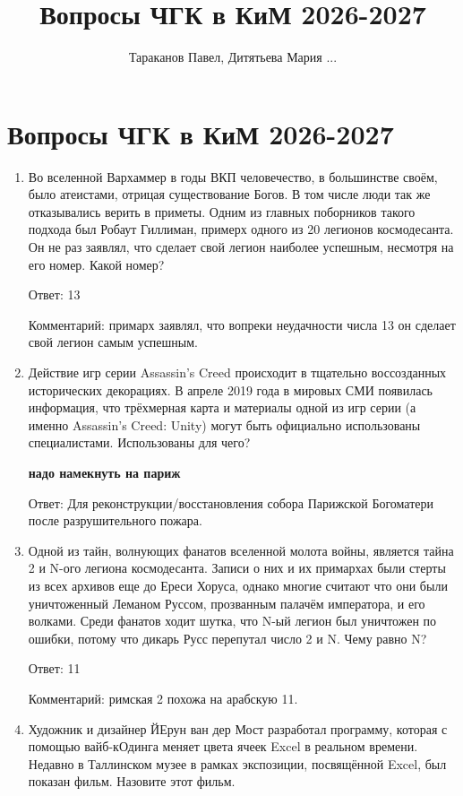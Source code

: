 \documentclass[oneside,final,14pt]{extreport}
\title{\textbf{Вопросы ЧГК в КиМ 2026-2027}}
\author{Тараканов Павел, Дитятьева Мария ...}
\begin{document}
\maketitle

\section*{Вопросы ЧГК в КиМ 2026-2027}
\begin{enumerate}
    \item Во вселенной Вархаммер в годы ВКП человечество, в большинстве своём, было атеистами, отрицая существование Богов. В том числе люди так же отказывались верить в приметы. Одним из главных поборников такого подхода был Робаут Гиллиман, примерх одного из 20 легионов космодесанта. Он не раз заявлял, что сделает свой легион наиболее успешным, несмотря на его номер. Какой номер?

    Ответ: 13

    Комментарий: примарх заявлял, что вопреки неудачности числа 13 он сделает свой легион самым успешным.

    \item Действие игр серии Assassin's Creed происходит в тщательно воссозданных исторических декорациях. В апреле 2019 года в мировых СМИ появилась информация, что трёхмерная карта и материалы одной из игр серии (а именно Assassin's Creed: Unity) могут быть официально использованы специалистами. Использованы для чего?

    \textbf{надо намекнуть на париж}

    Ответ: Для реконструкции/восстановления собора Парижской Богоматери после разрушительного пожара.

    \item Одной из тайн, волнующих фанатов вселенной молота войны, является тайна 2 и N-ого легиона космодесанта. Записи о них и их примархах были стерты из всех архивов еще до Ереси Хоруса, однако многие считают что они были уничтоженный Леманом Руссом, прозванным палачём императора, и его волками. Среди фанатов ходит шутка, что N-ый легион был уничтожен по ошибки, потому что дикарь Русс перепутал число 2 и N. Чему равно N?

    Ответ: 11

    Комментарий: римская 2 похожа на арабскую 11.

    \item Художник и дизайнер ЙЕрун ван дер Мост разработал программу, которая с помощью вайб-кОдинга меняет цвета ячеек Excel в реальном времени. Недавно в Таллинском музее в рамках экспозиции, посвящённой Excel, был показан фильм. Назовите этот фильм.


\end{enumerate}
\end{document}
